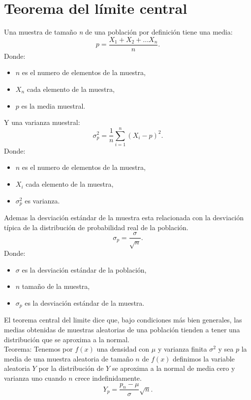 \documentclass[]{article}
\begin{document}
\section{Teorema del límite central}
Una muestra de tamaño \textit{n} de una población por definición tiene una media:
\[ p = \frac{X_{1} + X_{2} +...X_{n}}{n}.\]
Donde:
\begin{itemize}
	\item $n$ es el numero de elementos de la muestra,
	\item $X_{n}$ cada elemento de la muestra,
	\item $p$ es la media muestral.
\end{itemize}
Y una varianza muestral:
\[ \sigma_{p}^{2} = \frac{1}{n}\sum_{i=1}^{n}(X_ {i} - p)^{2}.\]
Donde:
\begin{itemize}
	\item $n$ es el numero de elementos de la muestra,
	\item $X_{i}$ cada elemento de la muestra,
	\item $\sigma_{p}^{2}$ es varianza.
\end{itemize}
Ademas la desviación estándar de la muestra esta relacionada con la desviación típica de la distribución de probabilidad real de la población.
\[ \sigma_{p} = \frac{\sigma}{\sqrt{n}}.\]
Donde:
\begin{itemize}
	\item $\sigma$ es la desviación estándar de la población,
	\item $n$ tamaño de la muestra,
	\item $\sigma_{p}$ es la desviación estándar de la muestra.
\end{itemize}
El teorema central del limite dice que, bajo condiciones más bien generales, las medias obtenidas de muestras aleatorias de una población tienden a tener una distribución que se aproxima a la normal.\\
Teorema: Tenemos por $f(x)$ una densidad con $\mu$ y varianza finita $\sigma^{2}$ y sea $p$ la media de una muestra aleatoria de tamaño $n$ de $f(x)$ definimos la variable aleatoria $Y$ por la distribución de $Y$ se aproxima a la normal de media cero y varianza uno cuando $n$ crece indefinidamente.
\[ Y_{p} = \frac{p_{n} - \mu}{\sigma}\sqrt{n}.\]
\end{document}
